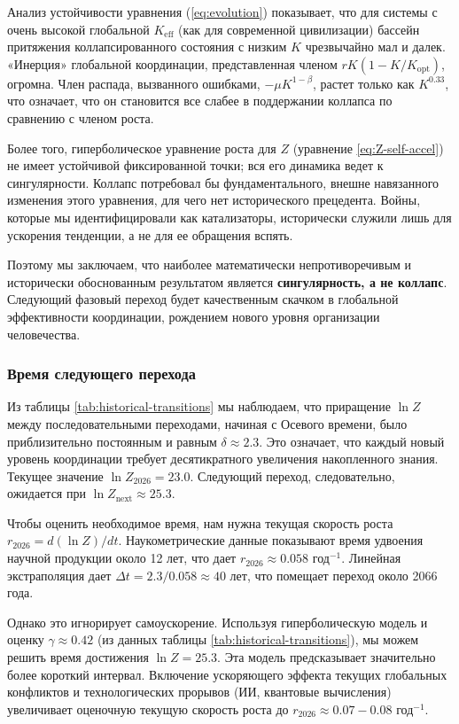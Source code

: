 \documentclass[12pt,a4paper]{article}
\theoremstyle{remark}
\begin{document}
	Анализ устойчивости уравнения (\ref{eq:evolution}) показывает, что для системы с очень высокой глобальной $K_{\text{eff}}$ (как для современной цивилизации) бассейн притяжения коллапсированного состояния с низким $K$ чрезвычайно мал и далек. «Инерция» глобальной координации, представленная членом $rK(1-K/K_{\text{opt}})$, огромна. Член распада, вызванного ошибками, $-\mu K^{1-\beta}$, растет только как $K^{0.33}$, что означает, что он становится все слабее в поддержании коллапса по сравнению с членом роста.
	
	Более того, гиперболическое уравнение роста для $Z$ (уравнение \ref{eq:Z-self-accel}) не имеет устойчивой фиксированной точки; вся его динамика ведет к сингулярности. Коллапс потребовал бы фундаментального, внешне навязанного изменения этого уравнения, для чего нет исторического прецедента. Войны, которые мы идентифицировали как катализаторы, исторически служили лишь для ускорения тенденции, а не для ее обращения вспять.
	
	Поэтому мы заключаем, что наиболее математически непротиворечивым и исторически обоснованным результатом является \textbf{сингулярность, а не коллапс}. Следующий фазовый переход будет качественным скачком в глобальной эффективности координации, рождением нового уровня организации человечества.
	
	\subsubsection{Время следующего перехода}
	
	Из таблицы \ref{tab:historical-transitions} мы наблюдаем, что приращение $\ln Z$ между последовательными переходами, начиная с Осевого времени, было приблизительно постоянным и равным $\delta \approx 2.3$. Это означает, что каждый новый уровень координации требует десятикратного увеличения накопленного знания. Текущее значение $\ln Z_{2026} = 23.0$. Следующий переход, следовательно, ожидается при $\ln Z_{\text{next}} \approx 25.3$.
	
	Чтобы оценить необходимое время, нам нужна текущая скорость роста $r_{2026} = d(\ln Z)/dt$. Наукометрические данные \cite{Bornmann2015} показывают время удвоения научной продукции около 12 лет, что дает $r_{2026} \approx 0.058$ год$^{-1}$. Линейная экстраполяция дает $\Delta t = 2.3 / 0.058 \approx 40$ лет, что помещает переход около 2066 года.
	
	Однако это игнорирует самоускорение. Используя гиперболическую модель и оценку $\gamma \approx 0.42$ (из данных таблицы \ref{tab:historical-transitions}), мы можем решить время достижения $\ln Z = 25.3$. Эта модель предсказывает значительно более короткий интервал. Включение ускоряющего эффекта текущих глобальных конфликтов и технологических прорывов (ИИ, квантовые вычисления) увеличивает оценочную текущую скорость роста до $r_{2026} \approx 0.07-0.08$ год$^{-1}$.
	
\end{document}
